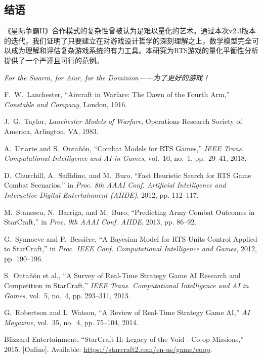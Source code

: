 \documentclass[a4paper,12pt]{article}
\begin{document}
\subsection{结语}
《星际争霸II》合作模式的复杂性曾被认为是难以量化的艺术。通过本次v2.3版本的迭代，我们证明了只要建立在对游戏设计哲学的深刻理解之上，数学模型完全可以成为理解和评估复杂游戏系统的有力工具。本研究为RTS游戏的量化平衡性分析提供了一个严谨且可行的范例。

\begin{center}
\textit{For the Swarm, for Aiur, for the Dominion——为了更好的游戏！}
\end{center}

\begin{thebibliography}{99}\small
{} F.~W.~Lanchester, ``Aircraft in Warfare: The Dawn of the Fourth Arm,'' \emph{Constable and Company}, London, 1916.

 J.~G.~Taylor, \emph{Lanchester Models of Warfare}, Operations Research Society of America, Arlington, VA, 1983.

 A.~Uriarte and S.~Ontañón, ``Combat Models for RTS Games,'' \emph{IEEE Trans. Computational Intelligence and AI in Games}, vol.~10, no.~1, pp.~29–41, 2018.

 D.~Churchill, A.~Saffidine, and M.~Buro, ``Fast Heuristic Search for RTS Game Combat Scenarios,'' in \emph{Proc. 8th AAAI Conf. Artificial Intelligence and Interactive Digital Entertainment (AIIDE)}, 2012, pp. 112–117.

 M.~Stanescu, N.~Barriga, and M.~Buro, ``Predicting Army Combat Outcomes in StarCraft,'' in \emph{Proc. 9th AAAI Conf. AIIDE}, 2013, pp. 86–92.

 G.~Synnaeve and P.~Bessière, ``A Bayesian Model for RTS Units Control Applied to StarCraft,'' in \emph{Proc. IEEE Conf. Computational Intelligence and Games}, 2012, pp. 190–196.

 S.~Ontañón et al., ``A Survey of Real-Time Strategy Game AI Research and Competition in StarCraft,'' \emph{IEEE Trans. Computational Intelligence and AI in Games}, vol.~5, no.~4, pp. 293–311, 2013.

 G.~Robertson and I.~Watson, ``A Review of Real-Time Strategy Game AI,'' \emph{AI Magazine}, vol.~35, no.~4, pp. 75–104, 2014.

 Blizzard Entertainment, ``StarCraft II: Legacy of the Void - Co-op Missions,'' 2015. [Online]. Available: \url{https://starcraft2.com/en-us/game/coop}.


\end{thebibliography}
\end{document}
